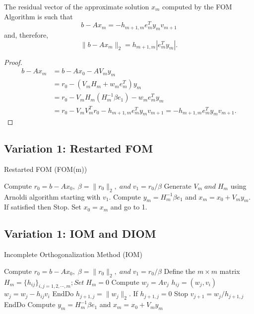 \documentclass[10pt,a4paper]{article}
\begin{document}
\begin{prop}
The residual vector of the approximate solution $x_m$ computed by the FOM Algorithm is such that 
$$b-Ax_m=-h_{m+1,m}e^T_my_mv_{m+1}$$
and, therefore,
$$\|b-Ax_m\|_2=h_{m+1,m}|e^T_my_m|.$$

\begin{proof}
\begin{align*}
b-Ax_m &= b-Ax_0-AV_my_m \\
&= r_0 - (V_mH_m+w_me^T_m)y_m \\
&= r_0 - V_mH_m(H^{-1}_m\beta e_1) - w_me^T_my_m \\
&= r_0 - V_mV^T_mr_0 - h_{m+1,m}e^T_my_mv_{m+1}=-h_{m+1,m}e^T_my_mv_{m+1}.
\end{align*}
\end{proof}
\end{prop}

\subsection{Variation 1: Restarted FOM}

\begin{algorithm}
\caption{Restarted FOM (FOM(m))}
\begin{algorithmic}[1]
\State Compute $r_0=b-Ax_0,\;\beta=\|r_0\|_2,\;and\;v_1=r_0/\beta$
\State Generate $V_m\;and\;H_m$ using Arnoldi algorithm starting with $v_1$.
\State Compute $y_m=H^{-1}_m\beta e_1$ and $x_m=x_0+V_my_m$. If satisfied then Stop.
\State Set $x_0=x_m$ and go to 1.
\end{algorithmic}
\end{algorithm}

\newpage

\subsection{Variation 1: IOM and DIOM}

\begin{algorithm}
\caption{Incomplete Orthogonalization Method (IOM)}
\begin{algorithmic}[1]
\State Compute $r_0=b-Ax_0,\;\beta=\|r_0\|_2,\;and\;v_1=r_0/\beta$
\State Define the $m\times m$ matrix $H_m = \{h_{ij}\}_{i,j=1,2,\cdots,m};Set\;H_m=0$
	\State Compute $w_j = Av_j$
		\State $h_{ij} = (w_j,v_i)$
		\State $w_j = w_j - h_{ij}v_i$
	\EndFor
	\State EndDo
	\State $h_{j+1,j} = \|w_j\|_2$. If $h_{j+1,j}=0$ Stop
	\State $v_{j+1}=w_j/h_{j+1,j}$
\EndFor
\State EndDo
\State Compute $y_m=H^{-1}_m\beta e_1$ and $x_m=x_0+V_my_m$
\end{algorithmic}
\end{algorithm}
\end{document}
